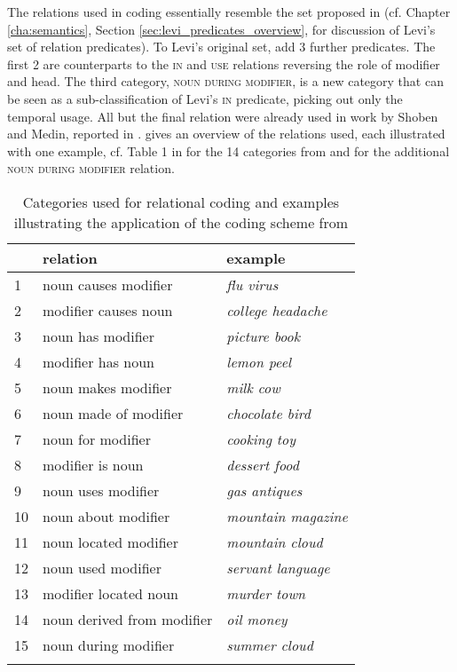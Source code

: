 The relations used in coding essentially resemble the set proposed in
\citet{Levi:1978} (cf. Chapter \ref{cha:semantics}, Section \ref{sec:levi_predicates_overview}, for discussion of Levi's set of relation predicates). To Levi's original set, \citet{GagneandShoben:1997} add 3 further predicates. The first 2 are counterparts to the
\textsc{in} and \textsc{use} relations reversing the role of modifier and head. The third category, \textsc{noun during
  modifier}, is a new category that can be seen as a sub-classification of Levi's \textsc{in} predicate, picking out only the temporal usage. All but the final relation were already used in work by
Shoben and Medin, reported in \citet{Shoben:1991}.  gives an
overview of the relations used, each illustrated with one example, cf. Table 1 in
\citet[72]{GagneandShoben:1997} for the 14 categories from \citet{Shoben:1991} and \citet[74]{GagneandShoben:1997} for the additional \textsc{noun during modifier} relation.


\begin{table}
  \centering
\begin{tabular}{lll}
\lsptoprule
&relation&example\\\midrule
1&noun causes modifier&\emph{flu virus}\\
2&modifier causes noun&\emph{college headache}\\
3&noun has modifier&\emph{picture book}\\
4&modifier has noun&\emph{lemon peel}\\
5&noun makes modifier&\emph{milk cow}\\
6&noun made of modifier&\emph{chocolate bird}\\
7&noun for modifier&\emph{cooking toy}\\
8&modifier is noun&\emph{dessert food}\\
9&noun uses modifier&\emph{gas antiques}\\
10&noun about modifier&\emph{mountain magazine}\\
11&noun located modifier&\emph{mountain cloud}\\
12&noun used modifier&\emph{servant language}\\
13&modifier located noun&\emph{murder town}\\
14&noun derived from modifier&\emph{oil money}\\
15&noun during modifier&\emph{summer cloud}\\
\lspbottomrule
\end{tabular}
\caption{Categories used for relational coding and examples
  illustrating the application of the coding scheme from
  \citet{GagneandShoben:1997}} \label{tab:gagneandshoben1997_relations}
\end{table}





